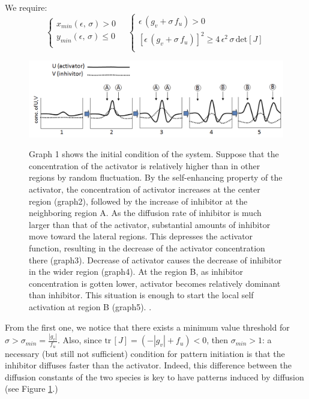 \newline
We require:
\begin{equation*}
    \begin{cases}
        x_{min}(\epsilon,\,\sigma)>0 \\
        y_{min}(\epsilon,\,\sigma)\leq 0 \\
    \end{cases}
    \quad
        \begin{cases}
        \epsilon\,(g_v +\sigma\,f_u) > 0 \\
        [\epsilon\,(g_v +\sigma\,f_u)]^2 \geq 4\,\epsilon^2\,\sigma\,\text{det}[J] \\
    \end{cases}
\end{equation*} 
\begin{figure}[H]
    \centering
    \includegraphics[width=\linewidth]{latex_source/images/turing/key_mechanism.png}
    \label{fig:key}
    \caption{{\small Graph 1 shows the initial condition of the system. Suppose that the concentration of the
activator is relatively higher than in other regions by random fluctuation. By the
self-enhancing property of the activator, the concentration of activator increases at the
center region (graph2), followed by the increase of inhibitor at the neighboring region A.
As the diffusion rate of inhibitor is much larger than that of the activator, substantial
amounts of inhibitor move toward the lateral regions. This depresses the activator
function, resulting in the decrease of the activator concentration there (graph3).
Decrease of activator causes the decrease of inhibitor in the wider region (graph4). At
the region B, as inhibitor concentration is gotten lower, activator becomes relatively
dominant than inhibitor. This situation is enough to start the local self activation at
region B (graph5). \parencite[Figure taken from][Supplementary Information]{bio_article}. }}
   \label{fig:key}
\end{figure}
\noindent 
From the first one, we notice that there exists a minimum value threshold for $\sigma > \sigma_{min}= \frac{|g_v|}{f_u}$. Also, since $\text{tr}\,[J]=(-|g_v| +f_u)<0$, then $\sigma_{min}> 1$: a necessary (but still not sufficient) condition for pattern initiation is that the inhibitor diffuses faster than the activator. Indeed, this difference between the diffusion constants of the two species is key to have patterns induced by diffusion (see Figure \ref{fig:key}.)
